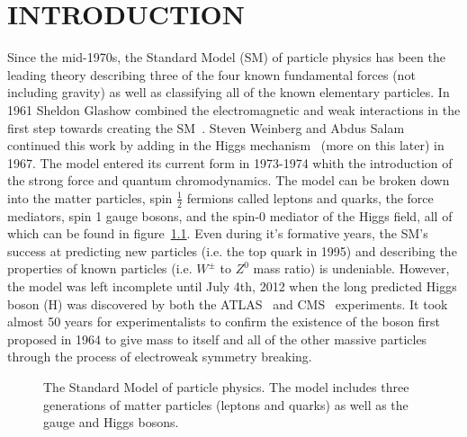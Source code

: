 %
%
%



\pagestyle{plain} %
\setcounter{page}{1}


\chapter{\uppercase {Introduction}}

Since the mid-1970s, the Standard Model (SM) of particle physics has been the leading theory describing three of the four known fundamental forces (not including gravity) as well as classifying all of the known elementary particles.
In 1961 Sheldon Glashow combined the electromagnetic and weak interactions in the first step towards creating the SM~\cite{GLASHOW1961579}.
Steven Weinberg and Abdus Salam~\cite{PhysRevLett.19.1264,salam} continued this work by adding in the Higgs mechanism~\cite{PhysRevLett.13.321,PhysRevLett.13.508,PhysRevLett.13.585} (more on this later) in 1967.
The model entered its current form in 1973-1974 whith the introduction of the strong force and quantum chromodynamics.
The model can be broken down into the matter particles, spin $\frac{1}{2}$ fermions called leptons and quarks, the force mediators, spin 1 gauge bosons, and the spin-0 mediator of the Higgs field, all of which can be found in figure~\ref{fig:standard_model}.
Even during it's formative years, the SM's success at predicting new particles (i.e. the top quark in 1995) and describing the properties of known particles (i.e. $W^{\pm}$ to $Z^{0}$ mass ratio) is undeniable.
However, the model was left incomplete until July 4th, 2012 when the long predicted Higgs boson (H) was discovered by both the ATLAS~\cite{20121} and CMS~\cite{201230} experiments.
It took almost 50 years for experimentalists to confirm the existence of the boson first proposed in 1964 to give mass to itself and all of the other massive particles through the process of electroweak symmetry breaking.

\begin{figure}[!hbt]
	\centering
	\resizebox{0.65\textwidth}{!}{}
	\caption{The Standard Model of particle physics. The model includes three generations of matter particles (leptons and quarks) as well as the gauge and Higgs bosons.}
	\label{fig:standard_model}
\end{figure}

